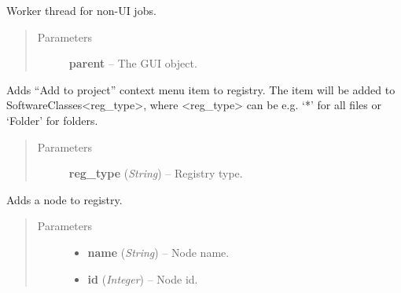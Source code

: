 \documentclass[letterpaper,10pt,english]{sphinxmanual}
\begin{document}
\begin{fulllineitems}
\label{threads:threads.worker.WORKER_THREAD}
Worker thread for non-UI jobs.
\begin{quote}\begin{description}
\item[{Parameters}] \leavevmode
\textbf{parent} -- The GUI object.

\end{description}\end{quote}

\begin{fulllineitems}
\label{threads:threads.worker.WORKER_THREAD.add_project_registry_entry}
Adds ``Add to project'' context menu item to registry. The item
will be added to SoftwareClasses\textless{}reg\_type\textgreater{}, where \textless{}reg\_type\textgreater{}
can be e.g. `*' for all files or `Folder' for folders.
\begin{quote}\begin{description}
\item[{Parameters}] \leavevmode
\textbf{reg\_type} (\emph{String}) -- Registry type.

\end{description}\end{quote}

\end{fulllineitems}


\begin{fulllineitems}
\label{threads:threads.worker.WORKER_THREAD.add_registry_entry}
Adds a node to registry.
\begin{quote}\begin{description}
\item[{Parameters}] \leavevmode\begin{itemize}
\item {} 
\textbf{name} (\emph{String}) -- Node name.

\item {} 
\textbf{id} (\emph{Integer}) -- Node id.


\end{itemize}
\end{description}
\end{quote}
\end{fulllineitems}
\end{fulllineitems}
\end{document}
